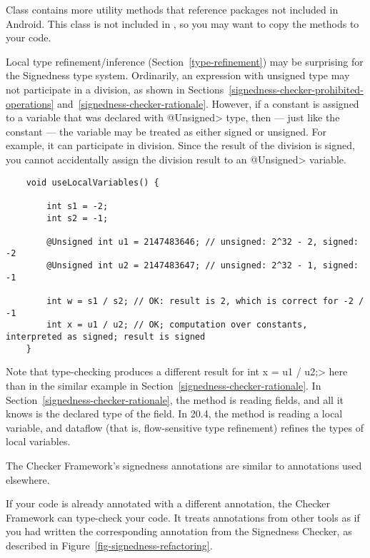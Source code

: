 Class  contains more utility
methods that reference packages not included in Android.  This class is not
included in , so you may want to copy the methods to your code.



Local type refinement/inference (Section~\ref{type-refinement}) may be
surprising for the Signedness type system.  Ordinarily, an expression with
unsigned type may not participate in a division, as shown in
Sections~\ref{signedness-checker-prohibited-operations}
and~\ref{signedness-checker-rationale}.  However, if a constant is assigned
to a variable that was declared with \<@Unsigned> type, then --- just like
the constant --- the variable may be treated as either signed or unsigned.
For example, it can participate in division.  Since the result of the
division is signed, you cannot accidentally assign the division result to
an \<@Unsigned> variable.

\begin{Verbatim}
    void useLocalVariables() {

        int s1 = -2;
        int s2 = -1;

        @Unsigned int u1 = 2147483646; // unsigned: 2^32 - 2, signed: -2
        @Unsigned int u2 = 2147483647; // unsigned: 2^32 - 1, signed: -1

        int w = s1 / s2; // OK: result is 2, which is correct for -2 / -1
        int x = u1 / u2; // OK; computation over constants, interpreted as signed; result is signed
    }
\end{Verbatim}

Note that type-checking produces a different result for \<int x = u1 / u2;>
here than in the similar example in
Section~\ref{signedness-checker-rationale}.  In
Section~\ref{signedness-checker-rationale}, the method is reading fields,
and all it knows is the declared type of the field.  In 20.4, the method is
reading a local variable, and dataflow (that is, flow-sensitive type
refinement) refines the types of local variables.



The Checker Framework's signedness annotations are similar to annotations used
elsewhere.

If your code is already annotated with a different
annotation, the Checker Framework can type-check your code.
It treats annotations from other tools
as if you had written the corresponding annotation from the
Signedness Checker, as described in Figure~\ref{fig-signedness-refactoring}.



